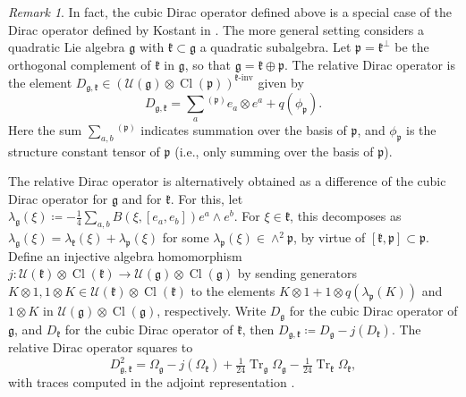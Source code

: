 \documentclass{amsart}
\theoremstyle{definition}
\theoremstyle{remark}
\newtheorem{remark}[theorem]{Remark}
\DeclareMathOperator{\Cl}{Cl}
\DeclareMathOperator{\Tr}{Tr}
\numberwithin{equation}{section}
\begin{document}
\begin{remark}
    In fact, the cubic Dirac operator defined above is a special case of the Dirac operator defined by Kostant in \cite{kostant_1999}. The more general setting considers a quadratic Lie algebra $\mathfrak{g}$ with $\mathfrak{k}\subset\mathfrak{g}$ a quadratic subalgebra. Let $\mathfrak{p}=\mathfrak{k}^\perp$ be the orthogonal complement of $\mathfrak{k}$ in $\mathfrak{g}$, so that $\mathfrak{g}=\mathfrak{k}\oplus\mathfrak{p}$. The relative Dirac operator is the element $D_{\mathfrak{g},\mathfrak{k}}\in (\mathcal{U}(\mathfrak{g})\otimes\Cl(\mathfrak{p}))^{\mathfrak{k}\text{-inv}}$ given by \cite[Proposition 7.7]{meinrenken_2013}
    \begin{equation*}
        D_{\mathfrak{g},\mathfrak{k}}=\sum_a{}^{(\mathfrak{p})} e_a\otimes e^a+q(\phi_\mathfrak{p}).
    \end{equation*}
    Here the sum $\sum_{a,b}{}^{(\mathfrak{p})}$ indicates summation over the basis of $\mathfrak{p}$, and $\phi_\mathfrak{p}$ is the structure constant tensor of $\mathfrak{p}$ (i.e., only summing over the basis of $\mathfrak{p}$).

    The relative Dirac operator is alternatively obtained as a difference of the cubic Dirac operator for $\mathfrak{g}$ and for $\mathfrak{k}$. For this, let $\lambda_\mathfrak{g}(\xi)\coloneq-\tfrac{1}{4}\sum_{a,b}B(\xi,[e_a,e_b])e^a\wedge e^b$. For $\xi\in\mathfrak{k}$, this decomposes as $\lambda_\mathfrak{g}(\xi)=\lambda_\mathfrak{k}(\xi)+\lambda_\mathfrak{p}(\xi)$ for some $\lambda_\mathfrak{p}(\xi)\in\wedge^2\mathfrak{p}$, by virtue of $[\mathfrak{k},\mathfrak{p}]\subset\mathfrak{p}$. Define an injective algebra homomorphism $j\colon \mathcal{U}(\mathfrak{k})\otimes\Cl(\mathfrak{k})\rightarrow\mathcal{U}(\mathfrak{g})\otimes\Cl(\mathfrak{g})$ by sending generators $K\otimes 1, 1\otimes K\in \mathcal{U}(\mathfrak{k})\otimes\Cl(\mathfrak{k})$ to the elements $K\otimes 1+1\otimes q(\lambda_\mathfrak{p}(K))$ and $1\otimes K$ in $\mathcal{U}(\mathfrak{g})\otimes\Cl(\mathfrak{g})$, respectively. Write $D_\mathfrak{g}$ for the cubic Dirac operator of $\mathfrak{g}$, and $D_\mathfrak{k}$ for the cubic Dirac operator of $\mathfrak{k}$, then $D_{\mathfrak{g},\mathfrak{k}}\coloneq D_\mathfrak{g}-j(D_{\mathfrak{k}})$. The relative Dirac operator squares to
    \begin{equation*}
        D_{\mathfrak{g},\mathfrak{k}}^2=\Omega_\mathfrak{g}-j(\Omega_\mathfrak{k})+\tfrac{1}{24}\Tr_\mathfrak{g}\Omega_\mathfrak{g}-\tfrac{1}{24}\Tr_\mathfrak{k}\Omega_\mathfrak{k},
    \end{equation*}
    with traces computed in the adjoint representation \cite[Theorem 2.13]{kostant_1999} \cite[Theorem 7.4]{meinrenken_2013}.
\end{remark}
\end{document}
